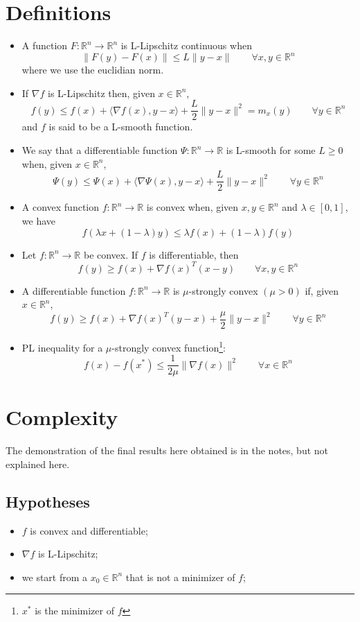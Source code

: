 \documentclass[12pt, openany]{report}
\theoremstyle{definition}
\begin{document}
\section{Definitions}
\begin{itemize}
    \item A function \(F:\mathbb{R}^n\rightarrow \mathbb{R}^n\) is L-Lipschitz continuous when \[\lVert F(y)-F(x)\rVert \le L\lVert y-x\rVert\qquad \forall x,y\in \mathbb{R}^n\]where we use the euclidian norm. 
    \item If \(\nabla f\) is L-Lipschitz then, given \(x\in \mathbb{R}^n\), \[f(y)\le f(x)+\langle \nabla f(x), y-x\rangle +\frac{L}{2}\lVert y-x\rVert^2 = m_x(y)\qquad \forall y\in \mathbb{R}^n\]and \(f\) is said to be a L-smooth function.
    \item We say that a differentiable function \(\Psi:\mathbb{R}^n\rightarrow \mathbb{R}\) is L-smooth for some \(L\ge 0\) when, given \(x\in \mathbb{R}^n\), \[\Psi(y) \le \Psi(x) + \langle \nabla \Psi (x),y-x\rangle + \frac{L}{2}\lVert y-x\rVert^2 \qquad \forall y\in \mathbb{R}^n\]
    \item A convex function \(f:\mathbb{R}^n \rightarrow \mathbb{R}\) is convex when, given \(x,y\in \mathbb{R}^n\) and \(\lambda \in [0,1]\), we have \[f(\lambda x+(1-\lambda)y)\le \lambda f(x)+(1-\lambda)f(y)\]
    \item Let \(f:\mathbb{R}^n\rightarrow\mathbb{R}\) be convex. If \(f\) is differentiable, then \[f(y) \ge f(x) + \nabla f(x)^T (x-y) \qquad \forall x,y\in \mathbb{R}^n\]
    \item A differentiable function \(f:\mathbb{R}^n\rightarrow \mathbb{R}\) is \(\mu\)-strongly convex \((\mu>0)\) if, given \(x\in \mathbb{R}^n\), \[f(y) \ge f(x) + \nabla f(x)^T(y-x) + \frac{\mu}{2}\lVert y-x\rVert^2 \qquad \forall y\in \mathbb{R}^n\]
    \item PL inequality for a \(\mu\)-strongly convex function\footnote{\(x^*\) is the minimizer of \(f\)}: \[f(x)-f(x^*)\le \frac{1}{2\mu} \lVert \nabla f(x)\rVert^2 \qquad \forall x\in \mathbb{R}^n\]
\end{itemize}
\section{Complexity}
The demonstration of the final results here obtained is in the notes, but not explained here. 
\subsection{Hypotheses}
\begin{itemize}
    \item \(f\) is convex and differentiable;
    \item \(\nabla f\) is L-Lipschitz;
    \item we start from a \(x_0\in \mathbb{R}^n\) that is not a minimizer of \(f\);
\end{itemize}
\end{document}
